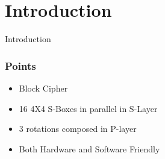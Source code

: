 \section{Introduction}

\begin{frame}{Introduction}
\frametitle{Points}

\begin{itemize}
 \item Block Cipher \\
 \item 16 4X4 S-Boxes in parallel in S-Layer \\
 \item 3 rotations composed in P-layer \\
 \item Both Hardware and Software Friendly \\
\end{itemize}

\end{frame}